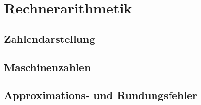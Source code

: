 \section{Rechnerarithmetik}

\subsection{Zahlendarstellung}

\subsection{Maschinenzahlen}

\subsection{Approximations- und Rundungsfehler}